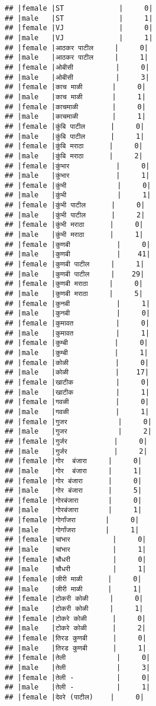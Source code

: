 \documentclass[
]{article}
\begin{document}
\begin{verbatim}
## |female |ST             |     0|
## |male   |ST             |     1|
## |female |VJ             |     0|
## |male   |VJ             |     1|
## |female |आठकर पाटील     |     0|
## |male   |आठकर पाटील     |     1|
## |female |ओबीसी          |     0|
## |male   |ओबीसी          |     3|
## |female |काच माळी       |     0|
## |male   |काच माळी       |     1|
## |female |काचमाळी        |     0|
## |male   |काचमाळी        |     1|
## |female |कुंबि पाटील      |     0|
## |male   |कुंबि पाटील      |     1|
## |female |कुंबि मराठा      |     0|
## |male   |कुंबि मराठा      |     2|
## |female |कुंभार           |     0|
## |male   |कुंभार           |     1|
## |female |कुंभी            |     0|
## |male   |कुंभी            |     1|
## |female |कुंभी पाटील      |     0|
## |male   |कुंभी पाटील      |     2|
## |female |कुंभी मराठा      |     0|
## |male   |कुंभी मराठा      |     1|
## |female |कुणबी           |     0|
## |male   |कुणबी           |    41|
## |female |कुणबी पाटील     |     1|
## |male   |कुणबी पाटील     |    29|
## |female |कुणबी मराठा     |     0|
## |male   |कुणबी मराठा     |     5|
## |female |कुनबी           |     1|
## |male   |कुनबी           |     0|
## |female |कुमावत          |     0|
## |male   |कुमावत          |     1|
## |female |कुम्बी           |     0|
## |male   |कुम्बी           |     1|
## |female |कोळी           |     0|
## |male   |कोळी           |    17|
## |female |खाटीक          |     0|
## |male   |खाटीक          |     1|
## |female |गवळी           |     0|
## |male   |गवळी           |     1|
## |female |गुजर            |     0|
## |male   |गुजर            |     2|
## |female |गुर्जर           |     0|
## |male   |गुर्जर           |     2|
## |female |गोर  बंजारा     |     0|
## |male   |गोर  बंजारा     |     1|
## |female |गोर बंजारा      |     0|
## |male   |गोर बंजारा      |     5|
## |female |गोरबंजारा       |     0|
## |male   |गोरबंजारा       |     1|
## |female |गोर्गांजरा       |     0|
## |male   |गोर्गांजरा       |     1|
## |female |चांभार          |     0|
## |male   |चांभार          |     1|
## |female |चौधरी          |     0|
## |male   |चौधरी          |     1|
## |female |जीरी माळी      |     0|
## |male   |जीरी माळी      |     1|
## |female |टोकरी कोळी     |     0|
## |male   |टोकरी कोळी     |     1|
## |female |टोकरे कोळी      |     0|
## |male   |टोकरे कोळी      |     2|
## |female |तिरड कुणबी      |     0|
## |male   |तिरड कुणबी      |     1|
## |female |तेली            |     0|
## |male   |तेली            |     3|
## |female |तेली -          |     0|
## |male   |तेली -          |     1|
## |female |देवरे (पाटील)    |     0|

\end{verbatim}
\end{document}
